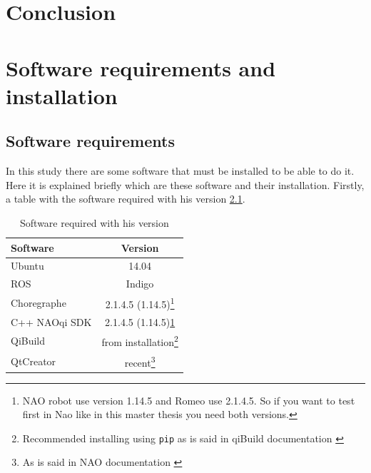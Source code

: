 \documentclass[12pt,a4paper,final,twoside,openright]{report}
\renewcommand{\thefigure}{\arabic{chapter}.\arabic{figure}}
\renewcommand{\thetable}{\arabic{chapter}.\arabic{table}}
\renewcommand{\theequation}{\arabic{chapter}.\arabic{equation}}
\renewcommand{\thefootnote}{\arabic{footnote}}
\begin{document}
\chapter{Conclusion}
\label{cha:conclusions}


\label{cha:references}

\appendix
\clearpage %
\addappheadtotoc
\appendixpage

\renewcommand{\thefigure}{\thechapter.\arabic{figure}}
\renewcommand{\thetable}{\thechapter.\arabic{table}}
\renewcommand{\theequation}{\thechapter.\arabic{equation}}
\renewcommand{\thefootnote}{\arabic{footnote}}

%
\chapter{Software requirements and installation}
\section{Software requirements}

In this study there are some software that must be installed to be able to do it. Here it is explained briefly which are these software and their installation. Firstly, a table with the software required with his version \ref{tab:soft_req}.

\begin{savenotes}
\begin{table}[h]
\begin{center}
\begin{tabular}{l|c|}
Software & Version\\ \hline
Ubuntu & 14.04\\
ROS & Indigo\\
Choregraphe & 2.1.4.5 (1.14.5)\footnote{\label{fn:nao_version}NAO robot use version 1.14.5 and Romeo use 2.1.4.5. So if you want to test first in Nao like in this master thesis you need both versions.}\\
C++ NAOqi SDK & 2.1.4.5 (1.14.5)\cref{fn:nao_version}\\
QiBuild & from installation\footnote{Recommended installing using \texttt{pip} as is said in qiBuild documentation \cite{AldebaranQiBuild}}\\
QtCreator & recent\footnote{As is said in NAO documentation \cite{AldebaranC++SDK}}\\
\end{tabular}
\caption{Software required with his version\label{tab:soft_req}}
\end{center}
\end{table}
\end{savenotes}
\end{document}
